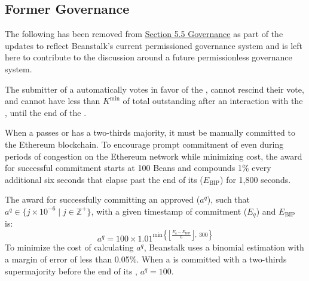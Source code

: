 \documentclass[class=article, crop=false]{standalone}
\begin{document}
\subsection{Former Governance}
The following has been removed from \hyperlink{subsection.5.5}{Section 5.5 Governance} as part of the updates to reflect Beanstalk's current permissioned governance system and is left here to contribute to the discussion around a future permissionless governance system. 

The submitter of a  automatically votes in favor of the , cannot rescind their vote, and cannot have less than $K^{\text{min}}$ of total outstanding  after an interaction with the , until the end of the .

When a  passes or has a two-thirds majority, it must be manually committed to the Ethereum blockchain. To encourage prompt commitment of  even during periods of congestion on the Ethereum network while minimizing cost, the award for successful commitment starts at 100 Beans and compounds 1\% every additional six seconds that elapse past the end of its  ($E_{\text{BIP}}$) for 1,800 seconds.

The award for successfully committing an approved  ($a^q$), such that $a^q \in \{j \times 10^{-6} \mid j \in \mathbb{Z}^{+} \}$, with a given timestamp of commitment ($E_q$) and $E_{\text{BIP}}$ is:
$$a^q = 100 \times 1.01^{\text{min}\left\{\left\lfloor\frac{E_q - E_{\text{BIP}}}{6}\right\rfloor,\ 300\right\}}$$
To minimize the cost of calculating $a^q$, Beanstalk uses a binomial estimation with a margin of error of less than 0.05\%. When a  is committed with a two-thirds supermajority before the end of its , $a^q = 100$.
\end{document}
